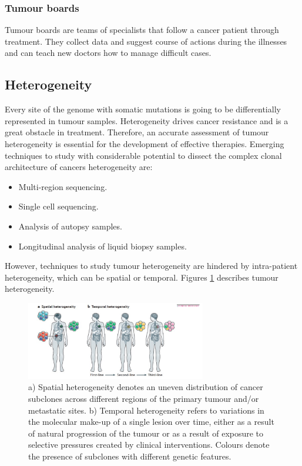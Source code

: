 		\subsubsection{Tumour boards}
		Tumour boards are teams of specialists that follow a cancer patient through treatment.
		They collect data and suggest course of actions during the illnesses and can teach new doctors how to manage difficult cases.

	\subsection{Heterogeneity}
	Every site of the genome with somatic mutations is going to be differentially represented in tumour samples.
	Heterogeneity drives cancer resistance and is a great obstacle in treatment.
	Therefore, an accurate assessment of tumour heterogeneity is essential for the development of effective therapies.
	Emerging techniques to study with considerable potential to dissect the complex clonal architecture of cancers heterogeneity are:

	\begin{multicols}{2}
		\begin{itemize}
			\item Multi-region sequencing.
			\item Single cell sequencing.
			\item Analysis of autopsy samples.
			\item Longitudinal analysis of liquid biopsy samples.
		\end{itemize}
	\end{multicols}

	However, techniques to study tumour heterogeneity are hindered by intra-patient heterogeneity, which can be spatial or temporal.
	Figures \ref{fig:hetero} describes tumour heterogeneity.

	\begin{figure}[H]
		\centering
		\includegraphics[width=0.7\textwidth]{heterogeneity.png}
		\caption{a) Spatial heterogeneity denotes an uneven distribution of cancer subclones across different regions of the primary tumour and/or metastatic sites. b) Temporal heterogeneity refers to variations in the molecular make-up of a single lesion over time, either as a result of natural progression of the tumour or as a result of exposure to selective pressures created by clinical interventions. Colours denote the presence of subclones with different genetic features.}
		\label{fig:hetero}
	\end{figure}

